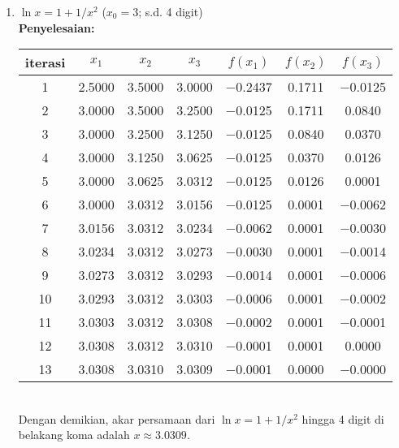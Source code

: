 \documentclass{article}
\newcommand{\penyelesaian}{\textbf{Penyelesaian: }}
\begin{document}
\begin{enumerate}
\begin{enumerate}
        \item $\ln{x} = 1 + 1/x^2$ ($x_0 = \num{3}$; s.d. 4 digit) \\
        \penyelesaian \\
        \begin{tabular}{|c|c|c|c|c|c|c|}
            \hline
            iterasi & $x_1$ & $x_2$ & $x_3$ & $f(x_1)$ & $f(x_2)$ & $f(x_3)$ \\
            \hline
            1 & \num{2,5000} & \num{3,5000} & \num{3,0000} & \num{-0,2437} & \num{0,1711} & \num{-0,0125}\\
            2 & \num{3,0000} & \num{3,5000} & \num{3,2500} & \num{-0,0125} & \num{0,1711} & \num{0,0840}\\
            3 & \num{3,0000} & \num{3,2500} & \num{3,1250} & \num{-0,0125} & \num{0,0840} & \num{0,0370}\\
            4 & \num{3,0000} & \num{3,1250} & \num{3,0625} & \num{-0,0125} & \num{0,0370} & \num{0,0126}\\
            5 & \num{3,0000} & \num{3,0625} & \num{3,0312} & \num{-0,0125} & \num{0,0126} & \num{0,0001}\\
            6 & \num{3,0000} & \num{3,0312} & \num{3,0156} & \num{-0,0125} & \num{0,0001} & \num{-0,0062}\\
            7 & \num{3,0156} & \num{3,0312} & \num{3,0234} & \num{-0,0062} & \num{0,0001} & \num{-0,0030}\\
            8 & \num{3,0234} & \num{3,0312} & \num{3,0273} & \num{-0,0030} & \num{0,0001} & \num{-0,0014}\\
            9 & \num{3,0273} & \num{3,0312} & \num{3,0293} & \num{-0,0014} & \num{0,0001} & \num{-0,0006}\\
            10 & \num{3,0293} & \num{3,0312} & \num{3,0303} & \num{-0,0006} & \num{0,0001} & \num{-0,0002}\\
            11 & \num{3,0303} & \num{3,0312} & \num{3,0308} & \num{-0,0002} & \num{0,0001} & \num{-0,0001}\\
            12 & \num{3,0308} & \num{3,0312} & \num{3,0310} & \num{-0,0001} & \num{0,0001} & \num{0,0000}\\
            13 & \num{3,0308} & \num{3,0310} & \num{3,0309} & \num{-0,0001} & \num{0,0000} & \num{-0,0000}\\
             \hline
            \end{tabular} \\      
        Dengan demikian, akar persamaan dari $\ln{x} = 1 + 1/x^2$ hingga 4 digit di belakang koma adalah $x \approx \num{3,0309}$.     


\end{enumerate}
\end{enumerate}
\end{document}
